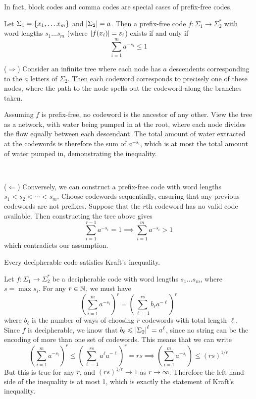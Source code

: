 \documentclass{article}
\begin{document}
\begin{note}
	In fact, block codes and comma codes are special cases of prefix-free codes.
\end{note}

\begin{theorem}
	\label{krafts-inequality}
    Let $\Sigma_1 = \left\lbrace x_1, \dots x_m \right\rbrace$ and $\left\lvert \Sigma_2 \right\rvert = a$. Then a prefix-free code $f: \Sigma_1 \to \Sigma_2^*$ with word lengths $s_1 \dots s_m$ (where $\left\lvert f(x_i) \right\rvert = s_i$) exists if and only if
    \[
	\sum_{i=1}^m a^{-s_i} \leq 1
	\]
\end{theorem}

\begin{prf}
    ($\Rightarrow$) Consider an infinite tree where each node has $a$ descendents corresponding to the $a$ letters of $\Sigma_2$. Then each codeword corresponds to precisely one of these nodes, where the path to the node spells out the codeword along the branches taken.
    
    Assuming $f$ is prefix-free, no codeword is the ancestor of any other. View the tree as a network, with water being pumped in at the root, where each node divides the flow equally between each descendant. The total amount of water extracted at the codewords is therefore the sum of $a^{-s_i}$, which is at most the total amount of water pumped in, demonstrating the inequality. 
    
    \ 
    
    ($\Leftarrow$) Conversely, we can construct a prefix-free code with word lengths $s_1 < s_2 < \cdots < s_m$. Choose codewords sequentially, ensuring that any previous codewords are not prefixes. Suppose that the $r$th codeword has no valid code available. Then constructing the tree above gives
    \[
	\sum_{i=1}^{r-1} a^{-s_i} = 1 \implies \sum_{i=1}^{m} a^{-s_i} > 1
	\]
	which contradicts our assumption.
\end{prf}

\begin{theorem}
	\label{mcmillan-karush}
    Every decipherable code satisfies Kraft's inequality.
\end{theorem}
\begin{prf}
	Let $f: \Sigma_1 \to \Sigma_2^*$ be a decipherable code with word lengths $s_1 \dots s_m$, where $s = \max s_i$. For any $r \in \mathbb{N}$, we must have
	\[
	\left( \sum_{i=1}^m a^{-s_i} \right)^r = \left( \sum_{\ell=1}^{rs} b_\ell a^{-\ell} \right)^r
	\]
	where $b_\ell$ is the number of ways of choosing $r$ codewords with total length $\ell$. Since $f$ is decipherable, we know that $b_\ell \leqslant \left\lvert \Sigma_2 \right\rvert^\ell = a^\ell$, since no string can be the encoding of more than one set of codewords. This means that we can write
	\[
	\left( \sum_{i=1}^m a^{-s_i} \right)^r \leq  \left( \sum_{\ell=1}^{rs} a^\ell a^{-\ell} \right)^r = rs \implies \left( \sum_{i=1}^m a^{-s_i} \right) \leq (rs)^{1/r}
	\]
	But this is true for any $r$, and $(rs)^{1/r} \to 1$ as $r \to \infty$. Therefore the left hand side of the inequality is at most 1, which is exactly the statement of Kraft's inequality.
\end{prf}
\end{document}
